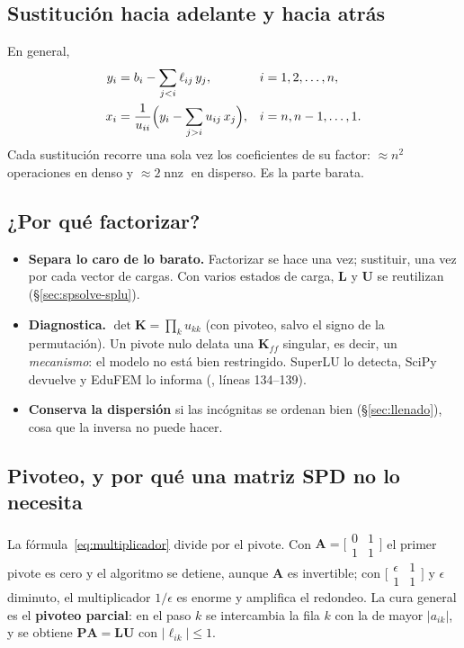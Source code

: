 \documentclass[11pt,a4paper]{article}
\newcommand{\cod}[1]{\texttt{\detokenize{#1}}}
\newcommand{\nnz}{\operatorname{nnz}}
\newcommand{\mK}{\bm{K}}
\newcommand{\Kff}{\bm{K}_{ff}}
\begin{document}
\subsection{Sustitución hacia adelante y hacia atrás}

En general,
\begin{align}
y_i&=b_i-\sum_{j<i}\ell_{ij}\,y_j, & i&=1,2,\dots,n, \label{eq:adelante}\\
x_i&=\frac{1}{u_{ii}}\Bigl(y_i-\sum_{j>i}u_{ij}\,x_j\Bigr), & i&=n,n-1,\dots,1. \label{eq:atras}
\end{align}
Cada sustitución recorre una sola vez los coeficientes de su factor: $\approx n^2$ operaciones en denso y $\approx2\nnz$ en disperso. Es la parte barata.

\subsection{¿Por qué factorizar?}

\begin{itemize}
  \item \textbf{Separa lo caro de lo barato.} Factorizar se hace una vez; sustituir, una vez por cada vector de cargas. Con varios estados de carga, $\bm{L}$ y $\bm{U}$ se reutilizan (§\ref{sec:spsolve-splu}).
  \item \textbf{Diagnostica.} $\det\mK=\prod_k u_{kk}$ (con pivoteo, salvo el signo de la permutación). Un pivote nulo delata una $\Kff$ singular, es decir, un \emph{mecanismo}: el modelo no está bien restringido. SuperLU lo detecta, SciPy devuelve \cod{NaN} y EduFEM lo informa (\cod{fem/solver.py}, líneas 134--139).
  \item \textbf{Conserva la dispersión} si las incógnitas se ordenan bien (§\ref{sec:llenado}), cosa que la inversa no puede hacer.
\end{itemize}

\subsection{Pivoteo, y por qué una matriz SPD no lo necesita}\label{sec:pivoteo}

La fórmula~\eqref{eq:multiplicador} divide por el pivote. Con $\bm{A}=\bigl[\begin{smallmatrix}0&1\\1&1\end{smallmatrix}\bigr]$ el primer pivote es cero y el algoritmo se detiene, aunque $\bm{A}$ es invertible; con $\bigl[\begin{smallmatrix}\epsilon&1\\1&1\end{smallmatrix}\bigr]$ y $\epsilon$ diminuto, el multiplicador $1/\epsilon$ es enorme y amplifica el redondeo. La cura general es el \textbf{pivoteo parcial}: en el paso $k$ se intercambia la fila $k$ con la de mayor $|a_{ik}|$, y se obtiene $\bm{P}\bm{A}=\bm{L}\bm{U}$ con $|\ell_{ik}|\le1$.
\end{document}
